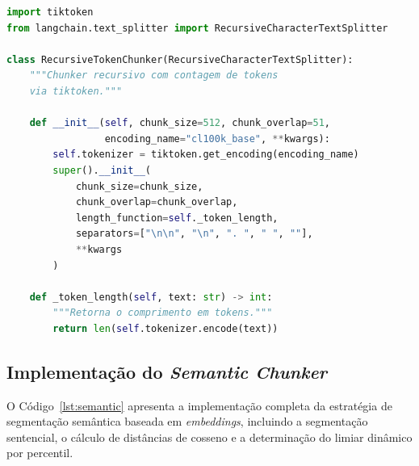 \documentclass[
	12pt,				%
	openright,			%
	oneside,			%
	a4paper,			%
	tccpreliminar,		%
	]{ABNT-DC-UEL}
\begin{document}
\begin{lstlisting}[language=Python, caption={Implementação do \textit{Recursive Character Text Splitter} com contagem de tokens via \texttt{tiktoken}.}, label=lst:recursive]
import tiktoken
from langchain.text_splitter import RecursiveCharacterTextSplitter

class RecursiveTokenChunker(RecursiveCharacterTextSplitter):
    """Chunker recursivo com contagem de tokens 
    via tiktoken."""
    
    def __init__(self, chunk_size=512, chunk_overlap=51,
                 encoding_name="cl100k_base", **kwargs):
        self.tokenizer = tiktoken.get_encoding(encoding_name)
        super().__init__(
            chunk_size=chunk_size,
            chunk_overlap=chunk_overlap,
            length_function=self._token_length,
            separators=["\n\n", "\n", ". ", " ", ""],
            **kwargs
        )

    def _token_length(self, text: str) -> int:
        """Retorna o comprimento em tokens."""
        return len(self.tokenizer.encode(text))
\end{lstlisting}

\subsection{Implementação do \textit{Semantic Chunker}}

O Código~\ref{lst:semantic} apresenta a implementação completa da estratégia de segmentação semântica baseada em \textit{embeddings}, incluindo a segmentação sentencial, o cálculo de distâncias de cosseno e a determinação do limiar dinâmico por percentil.
\end{document}
